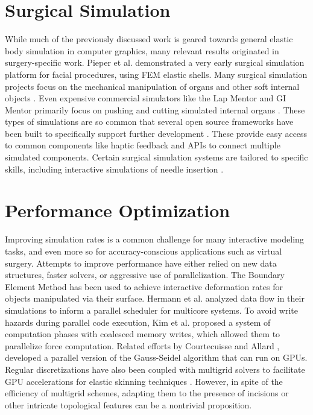 \documentclass[12pt,oneside,letterpaper]{memoir}
\begin{document}
\section{Surgical Simulation}
While much of the previously discussed work is geared towards general
elastic body simulation in computer graphics, many relevant results
originated in surgery-specific work. Pieper et al.\!
 demonstrated a very early surgical simulation
platform for facial procedures, using FEM elastic shells.  Many
surgical simulation projects focus on the mechanical manipulation of
organs and other soft internal objects
\cite{NienhS:2001,KimCDS:2007}. Even expensive commercial simulators
like the Lap Mentor and GI Mentor primarily focus on pushing and
cutting simulated internal organs
\cite{SUSAC:2002--2014b,SUSAC:2002--2014}. These types of simulations
are so common that several open source frameworks have been built to
specifically support further development
\cite{AllarCFBPDDGo:2007,CavusGT:2006}. These provide easy access to
common components like haptic feedback and APIs to connect multiple
simulated components. Certain surgical simulation systems are tailored
to specific skills, including interactive simulations of needle
insertion \cite{ChentARCHGSO:2009}.

\section{Performance Optimization}
Improving simulation rates is a common challenge for many interactive
modeling tasks, and even more so for accuracy-conscious applications
such as virtual surgery. Attempts to improve performance have either
relied on new data structures, faster solvers, or aggressive use of
parallelization.  The Boundary Element Method \cite{JamesP:1999} has
been used to achieve interactive deformation rates for objects
manipulated via their surface.  Hermann et al.\!
 analyzed data flow in their simulations to
inform a parallel scheduler for multicore systems. To avoid write
hazards during parallel code execution, Kim et al.\!
 proposed a system of computation phases with
coalesced memory writes, which allowed them to parallelize force
computation. Related efforts by Courtecuisse and Allard
, developed a parallel version of the
Gauss-Seidel algorithm that can run on GPUs. Regular discretizations
have also been coupled with multigrid solvers to facilitate GPU
accelerations for elastic skinning techniques \cite{McAdaST:2010}.
However, in spite of the efficiency of multigrid schemes, adapting
them to the presence of incisions or other intricate topological
features can be a nontrivial proposition.
\end{document}
